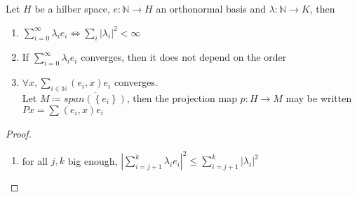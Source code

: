 \documentclass[../main.tex]{subfiles}
\begin{document}
\begin{lemma}
Let $H$  be a hilber space, $e: \mathbb{N}\to H$ an orthonormal basis and $\lambda: \mathbb{N}\to K$, then
\begin{enumerate}
\item $ \sum_{i=0}^{ \infty } \lambda_i e_i \iff \sum_i |\lambda_i|^{2} < \infty $ 
\item If $ \sum_{i=0}^{ \infty }\lambda_i e_i$ converges, then it does not depend on the order
\item $\forall x , \sum_{i\in \mathbb{N}}^{ }( e_i,x) e_i$ converges.\\
	Let $M \coloneqq \overline{span( \left\{ e_i \right\} ) }$, then the projection map $p:H \to M$ may be written $Px= \sum_{}^{ } ( e_i,x) e_i$ 
\end{enumerate}
\end{lemma}
\begin{proof}
\begin{enumerate}
\item for all $j,k$ big enough, $ | \sum_{i=j+1}^{ k} \lambda_i e_i|^{2} \leq \sum_{i=j+1}^{ k}|\lambda_i|^{2}$ 
\end{enumerate}
\end{proof}
\end{document}
